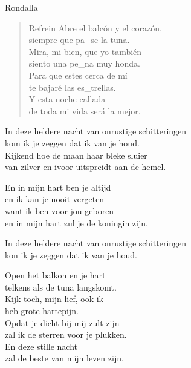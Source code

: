 \begin{song}[vals]{Rondalla}
\begin{verse}{Refrein}
Abre el balcón y el corazón,\\
siempre que pa\_se \hspace{1em}\hspace{1em} la tuna.\\
\chord{}Mira, mi bien, que yo tambi\'{e}n\\
siento una pe\_na \hspace{1em}\hspace{1em} muy honda.\\
\chord{}Para que estes cerca de m\'{i}\\
te bajar\'{e} las es\_trellas.\\
Y esta noche callada\\
de toda mi vida ser\'{a} la mejor.\hspace{4em} 
\end{verse}

\end{song}

\clearpage
\begin{translation}
In deze heldere nacht van onrustige schitteringen\\
kom ik je zeggen dat ik van je houd.\\
Kijkend hoe de maan haar bleke sluier\\
van zilver en ivoor uitspreidt aan de hemel.\vspace{\wlskip}

En in mijn hart ben je altijd\\
en ik kan je nooit vergeten\\
want ik ben voor jou geboren\\
en in mijn hart zul je de koningin zijn.\vspace{\wlskip}

In deze heldere nacht van onrustige schitteringen\\
kon ik je zeggen dat ik van je houd.\vspace{\wlskip}

Open het balkon en je hart\\
telkens als de tuna langskomt.\\
Kijk toch, mijn lief, ook ik\\
heb grote hartepijn.\\
Opdat je dicht bij mij zult zijn\\
zal ik de sterren voor je plukken.\\
En deze stille nacht\\
zal de beste van mijn leven zijn.
\end{translation}
